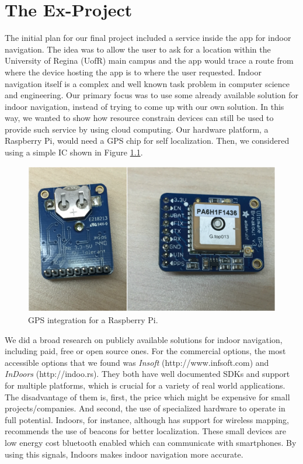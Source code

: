 \chapter{The Ex-Project}
\label{sec:ex-project}


The initial plan for our final project included a service inside the app for indoor navigation.
The idea was to allow the user to ask for a location within the University of Regina (UofR) main campus and the app would trace a route from where the device hosting the app is to where the user requested.
Indoor navigation itself is a complex and well known task problem in computer science and engineering.
Our primary focus was to use some already available solution for indoor navigation, instead of trying to come up with our own solution.
In this way, we wanted to show how resource constrain devices can still be used to provide such service by using cloud computing.
Our hardware platform, a Raspberry Pi, would need a GPS chip for self localization.
Then, we considered using a simple IC shown in Figure \ref{fig:chip}.

\begin{figure}
\begin{center}
\includegraphics[width=\textwidth]{figures/chip_gps.png}
\caption{GPS integration for a Raspberry Pi.}
\label{fig:chip}
\end{center}
\end{figure}

We did a broad research on publicly available solutions for indoor navigation, including paid, free or open source ones.
For the commercial options, the most accessible options that we found was \emph{Insoft} (http://www.infsoft.com) and \emph{InDoors} (http://indoo.rs).
They both have well documented SDKs and support for multiple platforms, which is crucial for a variety of real world applications.
The disadvantage of them is, first, the price which might be expensive for small projects/companies. And second, the use of specialized hardware to operate in full potential.
Indoors, for instance, although has support for wireless mapping, recommends the use of beacons for better localization.
These small devices are low energy cost bluetooth enabled which can communicate with smartphones.
By using this signals, Indoors makes indoor navigation more accurate.


